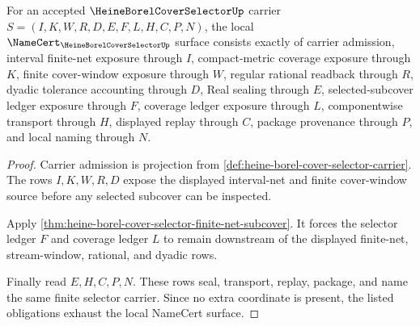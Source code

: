 \begin{theorem}
\label{thm:heine-borel-cover-selector-namecert-obligations}
For an accepted $\HeineBorelCoverSelectorUp$ carrier $S=(I,K,W,R,D,E,F,L,H,C,P,N)$, the local $\NameCert_{\HeineBorelCoverSelectorUp}$ surface consists exactly of carrier admission, interval finite-net exposure through $I$, compact-metric coverage exposure through $K$, finite cover-window exposure through $W$, regular rational readback through $R$, dyadic tolerance accounting through $D$, Real sealing through $E$, selected-subcover ledger exposure through $F$, coverage ledger exposure through $L$, componentwise transport through $H$, displayed replay through $C$, package provenance through $P$, and local naming through $N$.
\end{theorem}
\begin{proof}
Carrier admission is projection from \autoref{def:heine-borel-cover-selector-carrier}. The rows $I,K,W,R,D$ expose the displayed interval-net and finite cover-window source before any selected subcover can be inspected.

Apply \autoref{thm:heine-borel-cover-selector-finite-net-subcover}. It forces the selector ledger $F$ and coverage ledger $L$ to remain downstream of the displayed finite-net, stream-window, rational, and dyadic rows.

Finally read $E,H,C,P,N$. These rows seal, transport, replay, package, and name the same finite selector carrier. Since no extra coordinate is present, the listed obligations exhaust the local NameCert surface.
\end{proof}




